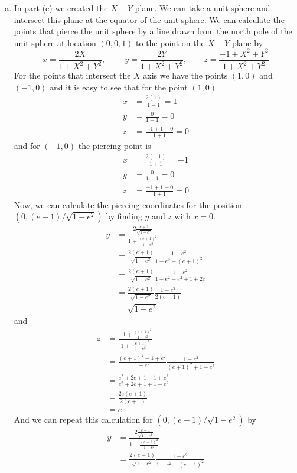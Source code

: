 \documentclass[11pt]{article}
\numberwithin{equation}{section}
\begin{document}
\begin{enumerate}[(a)]
\item In part (c) we created the $X-Y$ plane. We can take a unit sphere and intersect this 
plane at the equator of the unit sphere. We can calculate the points that pierce the unit 
sphere by a line drawn from the north pole of the unit sphere at location $(0,0,1)$ to the
point on the $X-Y$ plane by
$$x=\frac{2X}{1+X^2+Y^2},\qquad \; y=\frac{2Y}{1+X^2+Y^2},\qquad z=\frac{-1+X^2+Y^2}{1+X^2+Y^2}$$
For the points that intersect the $X$ axis we have the points $(1,0)$ and $(-1,0)$ and it is
easy to see that for the point $(1,0)$
\begin{align*}
x &= \frac{2(1)}{1+1} = 1\\
y &= \frac{0}{1+1} = 0\\
z &= \frac{-1+1+0}{1+1} = 0
\end{align*}
and for $(-1,0)$ the piercing point is
\begin{align*}
x &= \frac{2(-1)}{1+1} = -1\\
y &= \frac{0}{1+1} = 0\\
z &= \frac{-1+1+0}{1+1} = 0
\end{align*}
Now, we can calculate the piercing coordinates for the position $(0,(e+1)/\sqrt{1-e^2})$ by 
finding $y$ and $z$ with $x=0$.
\begin{align*}
y &= \frac{2\frac{e+1}{\sqrt{1-e^2}}}{1+\frac{(e+1)^2}{1-e^2}}\\
&= \frac{2(e+1)}{\sqrt{1-e^2}}\frac{1-e^2}{1-e^2+(e+1)^2}\\
&= \frac{2(e+1)}{\sqrt{1-e^2}}\frac{1-e^2}{1-e^2+e^2+1+2e}\\
&= \frac{2(e+1)}{\sqrt{1-e^2}}\frac{1-e^2}{2(e+1)}\\
&= \sqrt{1-e^2}
\end{align*}
and
\begin{align*}
z &= \frac{-1 + \frac{(e+1)^2}{1-e^2}}{1+\frac{(e+1)^2}{1-e^2}}\\
&= \frac{(e+1)^2-1+e^2}{1-e^2}\frac{1-e^2}{(e+1)^2+1-e^2}\\
&= \frac{e^2+2e+1-1+e^2}{e^2+2e+1+1-e^2}\\
&= \frac{2e(e+1)}{2(e+1)}\\
&= e
\end{align*}
And we can repeat this calculation for $(0,(e-1)/\sqrt{1-e^2})$ by
\begin{align*}
y &= \frac{2\frac{e-1}{\sqrt{1-e^2}}}{1+\frac{(e-1)^2}{1-e^2}}\\
&= \frac{2(e-1)}{\sqrt{1-e^2}}\frac{1-e^2}{1-e^2+(e-1)^2}\\

\end{align*}
\end{enumerate}
\end{document}
